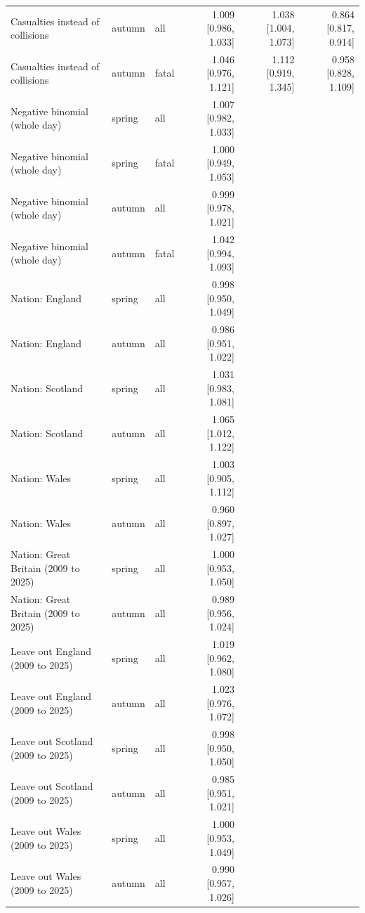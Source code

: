 \documentclass[11pt,a4paper]{article}
\begin{document}
{\begin{longtable}{p{5.6cm}llrrr}
Casualties instead of collisions & autumn & all & 1.009 [0.986, 1.033] & 1.038 [1.004, 1.073] & 0.864 [0.817, 0.914]\\
Casualties instead of collisions & autumn & fatal & 1.046 [0.976, 1.121] & 1.112 [0.919, 1.345] & 0.958 [0.828, 1.109]\\
Negative binomial (whole day) & spring & all & 1.007 [0.982, 1.033] &  & \\
Negative binomial (whole day) & spring & fatal & 1.000 [0.949, 1.053] &  & \\
Negative binomial (whole day) & autumn & all & 0.999 [0.978, 1.021] &  & \\
Negative binomial (whole day) & autumn & fatal & 1.042 [0.994, 1.093] &  & \\
Nation: England & spring & all & 0.998 [0.950, 1.049] &  & \\
Nation: England & autumn & all & 0.986 [0.951, 1.022] &  & \\
Nation: Scotland & spring & all & 1.031 [0.983, 1.081] &  & \\
Nation: Scotland & autumn & all & 1.065 [1.012, 1.122] &  & \\
Nation: Wales & spring & all & 1.003 [0.905, 1.112] &  & \\
Nation: Wales & autumn & all & 0.960 [0.897, 1.027] &  & \\
Nation: Great Britain (2009 to 2025) & spring & all & 1.000 [0.953, 1.050] &  & \\
Nation: Great Britain (2009 to 2025) & autumn & all & 0.989 [0.956, 1.024] &  & \\
Leave out England (2009 to 2025) & spring & all & 1.019 [0.962, 1.080] &  & \\
Leave out England (2009 to 2025) & autumn & all & 1.023 [0.976, 1.072] &  & \\
Leave out Scotland (2009 to 2025) & spring & all & 0.998 [0.950, 1.050] &  & \\
Leave out Scotland (2009 to 2025) & autumn & all & 0.985 [0.951, 1.021] &  & \\
Leave out Wales (2009 to 2025) & spring & all & 1.000 [0.953, 1.049] &  & \\
Leave out Wales (2009 to 2025) & autumn & all & 0.990 [0.957, 1.026] &  & \\
\bottomrule\end{longtable}}
\end{document}
